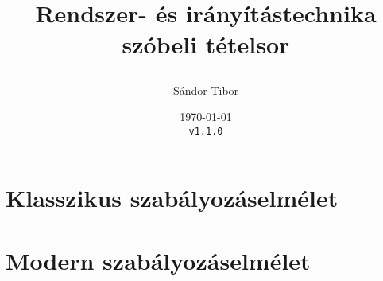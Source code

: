 \documentclass[a4paper,twoside,listof=totoc]{scrbook}
\title{
  Rendszer- és irányítástechnika \\
  szóbeli tételsor

}
\author{Sándor Tibor}
\date{
  \today \\
  \texttt{v1.1.0} \\
}
\numberwithin{equation}{section}
\begin{document}


\tableofcontents
\begingroup
\vfill
\let\cleardoublepage\relax
\listoffigures
\endgroup


\chapter{Klasszikus szabályozáselmélet}









\chapter{Modern szabályozáselmélet}

\setcounter{section}{7}









\end{document}
